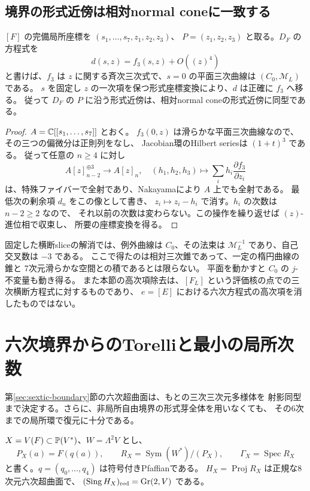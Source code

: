 \subsection{境界の形式近傍は相対normal coneに一致する}

\begin{theorem}[三次項より高い項の除去]\label{thm:relative-cubic-formality}
$[F]$ の完備局所座標を $(s_1,\ldots,s_7,z_1,z_2,z_3)$、
$P=(z_1,z_2,z_3)$ と取る。$D_F$ の方程式を
\[
 d(s,z)=f_3(s,z)+O((z)^4)
\]
と書けば、$f_3$ は $z$ に関する斉次三次式で、$s=0$ の平面三次曲線は
$(C_0,\mathcal M_L)$ である。
$s$ を固定し $z$ の一次項を保つ形式座標変換により、$d$ は正確に $f_3$ へ移る。
従って $D_F$ の $P$ に沿う形式近傍は、相対normal coneの形式近傍に同型である。
\end{theorem}

\begin{proof}
$A=\mathbb C[[s_1,\ldots,s_7]]$ とおく。
$f_3(0,z)$ は滑らかな平面三次曲線なので、その三つの偏微分は正則列をなし、
Jacobian環のHilbert seriesは $(1+t)^3$ である。
従って任意の $n\ge4$ に対し
\[
 A[z]_{n-2}^{\oplus3}\longrightarrow A[z]_n,
 \quad(h_1,h_2,h_3)\longmapsto
 \sum_i h_i\frac{\partial f_3}{\partial z_i}
\]
は、特殊ファイバーで全射であり、Nakayamaにより $A$ 上でも全射である。
最低次の剰余項 $d_n$ をこの像として書き、
$z_i\mapsto z_i-h_i$ で消す。$h_i$ の次数は $n-2\ge2$ なので、
それ以前の次数は変わらない。この操作を繰り返せば $(z)$-進位相で収束し、
所要の座標変換を得る。
\end{proof}

固定した横断sliceの解消では、例外曲線は $C_0$、その法束は
$\mathcal M_L^{-1}$ であり、自己交叉数は $-3$ である。
ここで得たのは相対三次錐であって、一定の楕円曲線の錐と
7次元滑らかな空間との積であるとは限らない。
平面を動かすと $C_0$ の $j$-不変量も動き得る。
また本節の高次項除去は、$[F_L]$ という評価核の点での三次横断方程式に対するものであり、
$e=[E]$ における六次方程式の高次項を消したものではない。

\section{六次境界からのTorelliと最小の局所次数}\label{sec:boundary-torelli}

第\ref{sec:sextic-boundary}節の六次超曲面は、もとの三次三次元多様体を
射影同型まで決定する。さらに、非局所自由境界の形式芽全体を用いなくても、
その6次までの局所環で復元に十分である。

$X=V(F)\subset\mathbb P(V^*)$、$W=\Lambda^2V$ とし、
\[
 P_X(a)=F(q(a)),\qquad
 R_X=\operatorname{Sym}(W^*)/(P_X),\qquad
 \Gamma_X=\operatorname{Spec}R_X
\]
と書く。$q=(q_0,\ldots,q_4)$ は符号付きPfaffianである。
$H_X=\operatorname{Proj}R_X$ は正規な8次元六次超曲面で、
$(\operatorname{Sing}H_X)_{\mathrm{red}}=\operatorname{Gr}(2,V)$ である。


